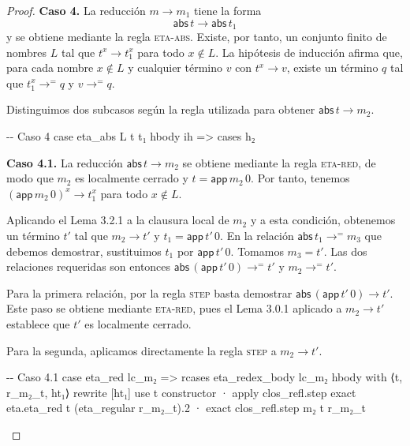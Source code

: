 \documentclass[
  spanish,
  letterpaper,
  DIV=11,
  numbers=noendperiod]{scrreprt}
\newenvironment{Shaded}{\begin{snugshade}}{\end{snugshade}}
\newcommand{\CommentTok}[1]{\textcolor[rgb]{0.37,0.37,0.37}{#1}}
\newcommand{\KeywordTok}[1]{\textcolor[rgb]{0.00,0.23,0.31}{\textbf{#1}}}
\newcommand{\NormalTok}[1]{\textcolor[rgb]{0.00,0.23,0.31}{#1}}
\renewcommand{\NormalTok}[1]{\textcolor[HTML]{000000}{#1}}
\renewcommand{\KeywordTok}[1]{\textcolor[HTML]{0000FF}{#1}}
\renewcommand{\CommentTok}[1]{\textcolor[HTML]{008000}{#1}}
\let\oldgreater\textgreater
\renewcommand{\textgreater}{\null\oldgreater}%
\theoremstyle{remark}
\begin{document}
\begin{proof}
\textbf{Caso 4.} La reducción \(m\longrightarrow m_1\) tiene la forma \[
\mathsf{abs}\,t\longrightarrow\mathsf{abs}\,t_1
\] y se obtiene mediante la regla \textsc{eta-abs}. Existe, por tanto,
un conjunto finito de nombres \(L\) tal que \(t^x\longrightarrow t_1^x\)
para todo \(x\notin L\). La hipótesis de inducción afirma que, para cada
nombre \(x\notin L\) y cualquier término \(v\) con
\(t^x\longrightarrow v\), existe un término \(q\) tal que
\(t_1^x\longrightarrow^{=}q\) y \(v\longrightarrow^{=}q\).

Distinguimos dos subcasos según la regla utilizada para obtener
\(\mathsf{abs}\,t\longrightarrow m_2\).

\begin{Shaded}
\begin{Highlighting}[]
  \CommentTok{{-}{-} Caso 4}
\NormalTok{  case eta\_abs L t t₁ hbody ih =\textgreater{}}
\NormalTok{    cases h₂}
\end{Highlighting}
\end{Shaded}

\textbf{Caso 4.1.} La reducción \(\mathsf{abs}\,t\longrightarrow m_2\)
se obtiene mediante la regla \textsc{eta-red}, de modo que \(m_2\) es
localmente cerrado y \(t=\mathsf{app}\,m_2\,0\). Por tanto, tenemos
\((\mathsf{app}\,m_2\,0)^x\longrightarrow t_1^x\) para todo
\(x\notin L\).

Aplicando el Lema 3.2.1 a la clausura local de \(m_2\) y a esta
condición, obtenemos un término \(t'\) tal que \(m_2\longrightarrow t'\)
y \(t_1=\mathsf{app}\,t'\,0\). En la relación
\(\mathsf{abs}\,t_1\longrightarrow^{=}m_3\) que debemos demostrar,
sustituimos \(t_1\) por \(\mathsf{app}\,t'\,0\). Tomamos \(m_3=t'\). Las
dos relaciones requeridas son entonces
\(\mathsf{abs}\,(\mathsf{app}\,t'\,0)\longrightarrow^{=}t'\) y
\(m_2\longrightarrow^{=}t'\).

Para la primera relación, por la regla \textsc{step} basta demostrar
\(\mathsf{abs}\,(\mathsf{app}\,t'\,0)\longrightarrow t'\). Este paso se
obtiene mediante \textsc{eta-red}, pues el Lema 3.0.1 aplicado a
\(m_2\longrightarrow t'\) establece que \(t'\) es localmente cerrado.

Para la segunda, aplicamos directamente la regla \textsc{step} a
\(m_2\longrightarrow t'\).

\begin{Shaded}
\begin{Highlighting}[]
    \CommentTok{{-}{-} Caso 4.1}
\NormalTok{    case eta\_red lc\_m₂ =\textgreater{}}
\NormalTok{      rcases eta\_redex\_body lc\_m₂ hbody }\KeywordTok{with}\NormalTok{ ⟨t\textquotesingle{}, r\_m₂\_t\textquotesingle{}, ht₁⟩}
      \KeywordTok{rewrite}\NormalTok{ [ht₁]}
\NormalTok{      use t\textquotesingle{}}
\NormalTok{      constructor}
\NormalTok{      · }\KeywordTok{apply}\NormalTok{ clos\_refl.step}
        \KeywordTok{exact}\NormalTok{ eta.eta\_red t\textquotesingle{} (eta\_regular r\_m₂\_t\textquotesingle{}).2}
\NormalTok{      · }\KeywordTok{exact}\NormalTok{ clos\_refl.step m₂ t\textquotesingle{} r\_m₂\_t\textquotesingle{}}
\end{Highlighting}
\end{Shaded}


\end{proof}
\end{document}
